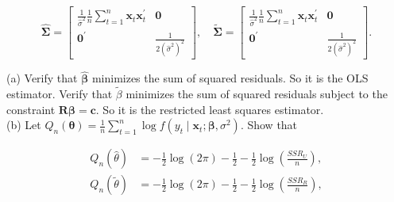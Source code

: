 \documentclass[10pt]{article}
\begin{document}
$$
\widehat{\mathbf{\Sigma}}=\left[\begin{array}{cc}
\frac{1}{\hat{\sigma}^{2}} \frac{1}{n} \sum_{t=1}^{n} \mathbf{x}_{t} \mathbf{x}_{t}^{\prime} & \mathbf{0} \\
\mathbf{0}^{\prime} & \frac{1}{2\left(\hat{\sigma}^{2}\right)^{2}}
\end{array}\right], \quad \widetilde{\mathbf{\Sigma}}=\left[\begin{array}{cc}
\frac{1}{\hat{\sigma}^{2}} \frac{1}{n} \sum_{t=1}^{n} \mathbf{x}_{t} \mathbf{x}_{t}^{\prime} & \mathbf{0} \\
\mathbf{0}^{\prime} & \frac{1}{2\left(\hat{\sigma}^{2}\right)^{2}}
\end{array}\right] .
$$

(a) Verify that $\widehat{\boldsymbol{\beta}}$ minimizes the sum of squared residuals. So it is the OLS estimator. Verify that $\widetilde{\beta}$ minimizes the sum of squared residuals subject to the constraint $\mathbf{R} \boldsymbol{\beta}=\mathbf{c}$. So it is the restricted least squares estimator.\\
(b) Let $Q_{n}(\boldsymbol{\theta})=\frac{1}{n} \sum_{t=1}^{n} \log f\left(y_{t} \mid \mathbf{x}_{t} ; \boldsymbol{\beta}, \sigma^{2}\right)$. Show that

$$
\begin{aligned}
Q_{n}(\hat{\theta}) & =-\frac{1}{2} \log (2 \pi)-\frac{1}{2}-\frac{1}{2} \log \left(\frac{S S R_{U}}{n}\right), \\
Q_{n}(\tilde{\theta}) & =-\frac{1}{2} \log (2 \pi)-\frac{1}{2}-\frac{1}{2} \log \left(\frac{S S R_{R}}{n}\right),
\end{aligned}
$$
\end{document}

